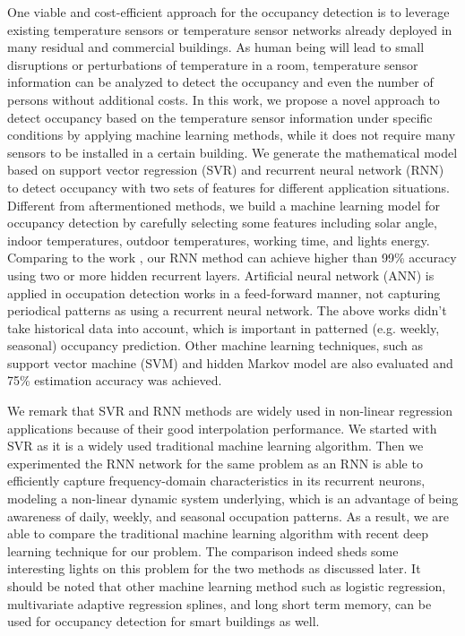 One viable and cost-efficient approach for the occupancy detection is
to leverage existing temperature sensors or temperature sensor
networks already deployed in many residual and commercial
buildings. As human being will lead to small disruptions or
perturbations of temperature in a room, temperature sensor information
can be analyzed to detect the occupancy and even the number of persons
without additional costs.
In this work, we propose a novel approach to detect occupancy based on
the temperature sensor information under specific conditions by
applying machine learning methods, while it does not require many
sensors to be installed in a certain building.  We generate the
mathematical model based on support vector regression (SVR) and
recurrent neural network (RNN) to detect occupancy with two sets of
features for different application situations.
Different from
  aftermentioned methods, we build a machine learning model for
  occupancy detection by carefully selecting some features including
  solar angle, indoor temperatures, outdoor temperatures, working
  time, and lights energy. Comparing to the work \cite{dong2014real},
  our RNN method can achieve higher than 99\% accuracy using two or
  more hidden recurrent layers. Artificial neural network (ANN) is
  applied in occupation detection works \cite{lam2009occupancy} in a
  feed-forward manner, not capturing periodical patterns as using a
  recurrent neural network. The above works didn't take historical data into
  account, which is important in patterned (e.g.  weekly, seasonal) occupancy
  prediction. Other machine learning techniques, such as support vector machine
  (SVM) and hidden Markov model are also evaluated and 75\% estimation accuracy
  was achieved.

We remark that SVR and RNN methods are widely used in non-linear
  regression applications because of their good interpolation
  performance.  We started with SVR as it is a widely used traditional
  machine learning algorithm. Then we experimented the RNN network for the
  same problem as an RNN is able to efficiently capture
  frequency-domain characteristics in its recurrent neurons, modeling
  a non-linear dynamic system underlying, which is an advantage of
  being awareness of daily, weekly, and seasonal occupation patterns.
  As a result, we are able to compare the traditional machine learning
  algorithm with recent deep learning technique for our problem. The
  comparison indeed sheds some interesting lights on this problem for
  the two methods as discussed later.  It should be noted that
  other machine learning method such as logistic regression, multivariate
  adaptive regression splines, and long short term memory, can be used for
  occupancy detection for smart buildings as well.

